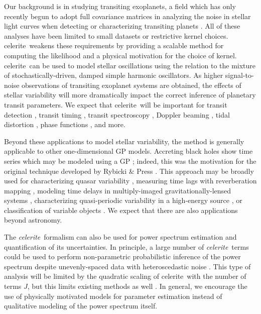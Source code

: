 \documentclass[manuscript, letterpaper]{aastex6}
\newcommand{\project}[1]{\textsf{#1}}
\newcommand{\celerite}{\project{celerite}}
\newcommand{\celeriteterm}{\emph{celerite}}
\begin{document}
Our background is in studying transiting exoplanets, a field which has only
recently begun to adopt full covariance matrices in analyzing the noise in
stellar light curves when detecting or characterizing transiting planets
\citep[for example,][]{Carter:2009, Gibson:2012, Barclay:2015, Evans:2015,
Aigrain:2016, Foreman-Mackey:2016b, Grunblatt:2016, Luger:2016}.
All of these analyses have been limited to small datasets or restrictive
kernel choices.
\celerite\ weakens these requirements by providing a scalable method for
computing the likelihood and a physical motivation for the choice of kernel.
\celerite\ can be used to model stellar oscillations using the relation to the
mixture of stochastically-driven, damped simple harmonic oscillators.
As higher signal-to-noise observations of transiting exoplanet systems are
obtained, the effects of stellar variability will more dramatically impact the
correct inference of planetary transit parameters.
We expect that \celerite\ will be important for transit detection
\citep{Pope:2016, Foreman-Mackey:2016b}, transit timing \citep{Agol:2005,
Holman:2005}, transit spectroscopy \citep{Brown:2001}, Doppler beaming
\citep{Loeb:2003, Zucker:2007}, tidal distortion \citep{Zucker:2007}, phase
functions \citep{Knutson:2007, Zucker:2007}, and more.

Beyond these applications to model stellar variability, the method is
generally applicable to other one-dimensional GP models.
Accreting black holes show time series which may be modeled using a GP
\citep{Kelly:2014}; indeed, this was the motivation for the original technique
developed by Rybicki \& Press \citep{Rybicki:1992, Rybicki:1995}.
This approach may be broadly used for characterizing quasar variability
\citep{MacLeod:2010}, measuring time lags with reverberation mapping
\citep{Zu:2011, Pancoast:2014}, modeling time delays in multiply-imaged
gravitationally-lensed systems \citep{Press:1998}, characterizing
quasi-periodic variability in a high-energy source \citep{McAllister:2016}, or
classification of variable objects \citep{Zinn:2016}.
We expect that there are also applications beyond astronomy.

The \celeriteterm\ formalism can also be used for power spectrum estimation and
quantification of its uncertainties.
In principle, a large number of \celeriteterm\ terms could be used to perform
non-parametric probabilistic inference of the power spectrum despite
unevenly-spaced data with heteroscedastic noise \citep[for
example,][]{Wilson:2013, Kelly:2014}.
This type of analysis will be limited by the quadratic scaling of \celerite\
with the number of terms $J$, but this limits existing methods as well
\citep[CARMA models,][]{Kelly:2014}.
In general, we encourage the use of physically motivated models for parameter
estimation instead of qualitative modeling of the power spectrum itself.
\end{document}
